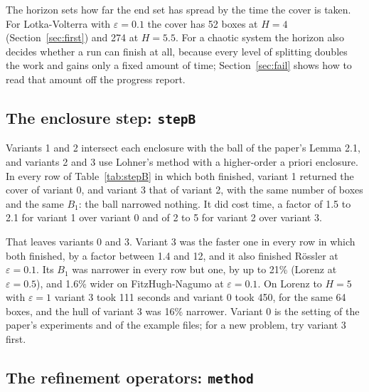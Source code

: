 \documentclass[11pt,a4paper]{article}
\newcommand{\eps}{\varepsilon}
\newcommand{\wmax}{w_{\max}}
\begin{document}
The horizon sets how far the end set has spread by the time the cover is
taken. For Lotka-Volterra with $\eps = 0.1$ the cover has 52 boxes at
$H = 4$ (Section~\ref{sec:first}) and 274 at $H = 5.5$. For a chaotic system the
horizon also decides whether a run can finish at all, because every level
of splitting doubles the work and gains only a fixed amount of time; Section~\ref{sec:fail} shows how to read that amount off the
progress report.

\subsection{The enclosure step: \texttt{stepB}}

\begin{table}[htb]
\centering\small
\caption{The four StepB variants: time and $\wmax(B_1)$.}
\label{tab:stepB}

\end{table}

Variants 1 and 2 intersect each enclosure with the ball of the paper's
Lemma 2.1, and variants 2 and 3 use Lohner's method with a higher-order a
priori enclosure. In every row of Table~\ref{tab:stepB} in which both
finished, variant 1 returned the cover of variant 0, and variant 3 that of
variant 2, with the same number of boxes and the same $B_1$: the ball
narrowed nothing. It did cost time, a factor of 1.5 to 2.1 for variant 1
over variant 0 and of 2 to 5 for variant 2 over variant 3.

That leaves variants 0 and 3. Variant 3 was the faster one in every row in
which both finished, by a factor between 1.4 and 12, and it also finished
R\"ossler at $\eps = 0.1$. Its $B_1$ was narrower in every row but one, by
up to 21\% (Lorenz at $\eps = 0.5$), and 1.6\% wider on FitzHugh-Nagumo at
$\eps = 0.1$. On Lorenz to $H = 5$ with $\eps = 1$ variant 3 took 111
seconds and variant 0 took 450, for the same 64 boxes, and the hull of
variant 3 was 16\% narrower.
Variant 0 is the setting of the paper's
experiments and of the example files; for a new problem, try variant 3
first.

\subsection{The refinement operators: \texttt{method}}

\begin{table}[htb]
\centering\small
\caption{The three refinement strategies: time and $\wmax(B_1)$.}
\label{tab:method}

\end{table}
\end{document}
